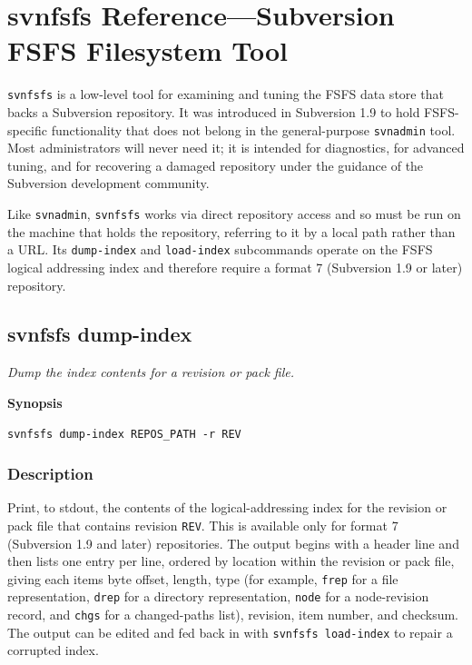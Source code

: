 \chapter{svnfsfs Reference---Subversion FSFS Filesystem
Tool}\label{svn.ref.svnfsfs}

\texttt{svnfsfs} is a low-level tool for examining and tuning the FSFS
data store that backs a Subversion repository. It was introduced in
Subversion 1.9 to hold FSFS-specific functionality that does not belong
in the general-purpose \texttt{svnadmin} tool. Most administrators will
never need it; it is intended for diagnostics, for advanced tuning, and
for recovering a damaged repository under the guidance of the Subversion
development community.

Like \texttt{svnadmin}, \texttt{svnfsfs} works via direct repository
access and so must be run on the machine that holds the repository,
referring to it by a local path rather than a URL. Its
\texttt{dump-index} and \texttt{load-index} subcommands operate on the
FSFS logical addressing index and therefore require a format 7 (Subversion
1.9 or later) repository.

\section{svnfsfs dump-index}\label{svn.ref.svnfsfs.c.dump-index}

\emph{Dump the index contents for a revision or pack file.}

\textbf{Synopsis}

\texttt{svnfsfs\ dump-index\ REPOS\_PATH\ -r\ REV}

\subsection{Description}

Print, to stdout, the contents of the logical-addressing index for the
revision or pack file that contains revision \texttt{REV}. This is
available only for format 7 (Subversion 1.9 and later) repositories. The
output begins with a header line and then lists one entry per line,
ordered by location within the revision or pack file, giving each
item\textquotesingle s byte offset, length, type (for example,
\texttt{frep} for a file representation, \texttt{drep} for a directory
representation, \texttt{node} for a node-revision record, and
\texttt{chgs} for a changed-paths list), revision, item number, and
checksum. The output can be edited and fed back in with
\texttt{svnfsfs\ load-index} to repair a corrupted index.

